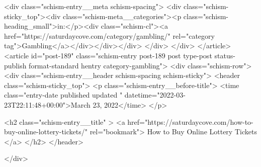 {		<div class="schism-entry__meta schism-spacing">			<div class="schism-sticky_top"><div class="schism-meta__categories"><p class="schism-heading_small">in:</p><div class="schism-cl"><a href="https://saturdaycove.com/category/gambling/" rel="category tag">Gambling</a></div></div></div>		</div>
	</div>
</article>
<article id="post-189" class="schism-entry post-189 post type-post status-publish format-standard hentry category-gambling">
	<div class="schism-row">		<div class="schism-entry__header schism-spacing schism-sticky">			<header class="schism-sticky_top">				<p class="schism-entry__before-title">
					<time class="entry-date published updated " datetime="2022-03-23T22:11:48+00:00">March 23, 2022</time>				</p>

				<h2 class="schism-entry__title" >
					<a href="https://saturdaycove.com/how-to-buy-online-lottery-tickets/" rel="bookmark">
						How to Buy Online Lottery Tickets					</a>
				</h2>
			</header>

					</div>

}
